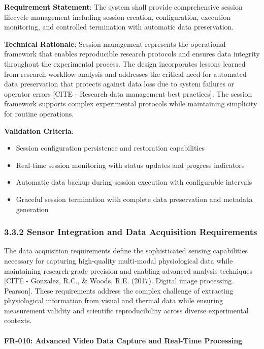 \documentclass[12pt,a4paper]{article}
\begin{document}
\textbf{Requirement Statement}: The system shall provide comprehensive session lifecycle management including session
creation, configuration, execution monitoring, and controlled termination with automatic data preservation.

\textbf{Technical Rationale}: Session management represents the operational framework that enables reproducible research
protocols and ensures data integrity throughout the experimental process. The design incorporates lessons learned from
research workflow analysis and addresses the critical need for automated data preservation that protects against data
loss due to system failures or operator errors [CITE - Research data management best practices]. The session framework
supports complex experimental protocols while maintaining simplicity for routine operations.

\textbf{Validation Criteria}:

\begin{itemize}
\item Session configuration persistence and restoration capabilities
\item Real-time session monitoring with status updates and progress indicators
\item Automatic data backup during session execution with configurable intervals
\item Graceful session termination with complete data preservation and metadata generation

\end{itemize}
\subsubsection{3.3.2 Sensor Integration and Data Acquisition Requirements}

The data acquisition requirements define the sophisticated sensing capabilities necessary for capturing high-quality
multi-modal physiological data while maintaining research-grade precision and enabling advanced analysis
techniques [CITE - Gonzalez, R.C., \& Woods, R.E. (2017). Digital image processing. Pearson]. These requirements address
the complex challenge of extracting physiological information from visual and thermal data while ensuring measurement
validity and scientific reproducibility across diverse experimental contexts.

\paragraph{FR-010: Advanced Video Data Capture and Real-Time Processing}
\end{document}
